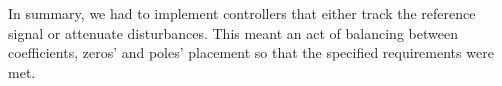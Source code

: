 In summary, we had to implement controllers that either track the reference
signal or attenuate disturbances. This meant an act of balancing between
coefficients, zeros' and poles' placement so that the specified requirements
were met.
